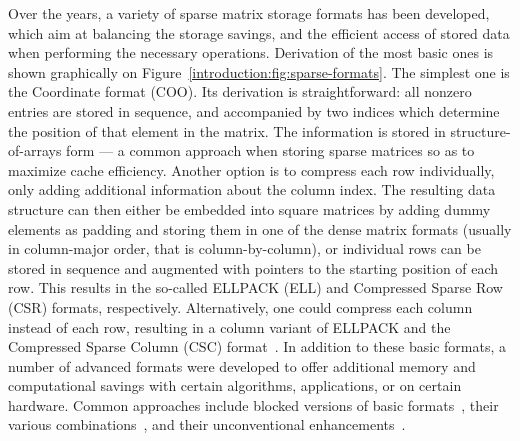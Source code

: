 Over the years, a variety of sparse matrix storage formats has been developed,
which aim at balancing the storage savings, and the efficient access of
stored data when performing the necessary operations. Derivation of the most
basic ones is shown graphically on Figure~\ref{introduction:fig:sparse-formats}.
The simplest one is the Coordinate format (COO). Its derivation is
straightforward: all nonzero entries are stored in sequence, and accompanied by
two indices which determine the position of that element in the matrix. The
information is stored in structure-of-arrays form --- a common approach when
storing sparse matrices so as to maximize cache efficiency. Another option is to
compress each row individually, only adding additional information about the
column index. The resulting data structure can then either be embedded into
square matrices by adding dummy elements as padding and storing them in one of
the dense matrix formats (usually in column-major order, that is column-by-column),
or individual rows can be stored in sequence and augmented with pointers to the
starting position of each row. This results in the so-called ELLPACK (ELL) and
Compressed Sparse Row (CSR) formats, respectively. Alternatively, one could
compress each column instead of each row, resulting in a column variant of
ELLPACK and the Compressed Sparse Column (CSC) format~\cite{saad}. In addition
to these basic formats, a number of advanced formats were developed to offer
additional memory and computational savings with certain algorithms,
applications, or on certain hardware. Common approaches include blocked versions
of basic formats~\cite{csb, bsr}, their various
combinations~\cite{sell-p,sell-c-sigma,bell-garland}, and their unconventional
enhancements~\cite{csr5, ecker}.

